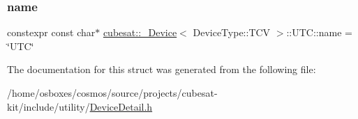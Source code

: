 \subsubsection{\texorpdfstring{name}{name}}
{\footnotesize\ttfamily constexpr const char$\ast$ \hyperlink{structcubesat_1_1__Device}{cubesat\+::\+\_\+\+Device}$<$ Device\+Type\+::\+T\+CV $>$\+::U\+T\+C\+::name = \char`\"{}U\+TC\char`\"{}\hspace{0.3cm}{\ttfamily [static]}}



The documentation for this struct was generated from the following file\+:\begin{DoxyCompactItemize}
\item 
/home/osboxes/cosmos/source/projects/cubesat-\/kit/include/utility/\hyperlink{DeviceDetail_8h}{Device\+Detail.\+h}\end{DoxyCompactItemize}
